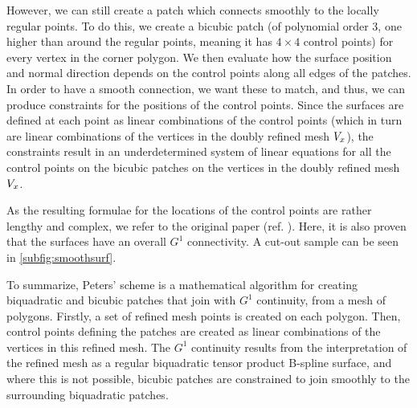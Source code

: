 However, we can still create a \Bez patch which connects smoothly to the locally regular points. To do this, we create a bicubic \Bez patch (of polynomial order 3, one higher than around the regular points, meaning it has $4\times4$ control points) for every vertex in the corner polygon.
We then evaluate how the surface position and normal direction depends on the \Bez control points along all edges of the patches. In order to have a smooth connection, we want these to match, and thus, we can produce constraints for the positions of the \Bez control points.
Since the surfaces are defined at each point as linear combinations of the \Bez control points (which in turn are linear combinations of the vertices in the doubly refined mesh $\petersPatchPoints$), the constraints result in an underdetermined system of linear equations for all the \Bez control points on the bicubic \Bez patches on the vertices in the doubly refined mesh $\petersPatchPoints$.

As the resulting formulae for the locations of the \Bez control points are rather lengthy and complex, we refer to the original paper (ref. \cite{peters1992constructing}). Here, it is also proven that the surfaces have an overall $G^1$ connectivity. A cut-out sample can be seen in \autoref{subfig:smoothsurf}.

To summarize, Peters' scheme is a mathematical algorithm for creating biquadratic and bicubic \Bez patches that join with $G^1$ continuity, from a mesh of polygons. Firstly, a set of refined mesh points is created on each polygon. Then, \Bez control points defining the patches are created as linear combinations of the vertices in this refined mesh. The $G^1$ continuity results from the interpretation of the refined mesh as a regular biquadratic tensor product B-spline surface, and where this is not possible, bicubic \Bez patches are constrained to join smoothly to the surrounding biquadratic patches.
%


